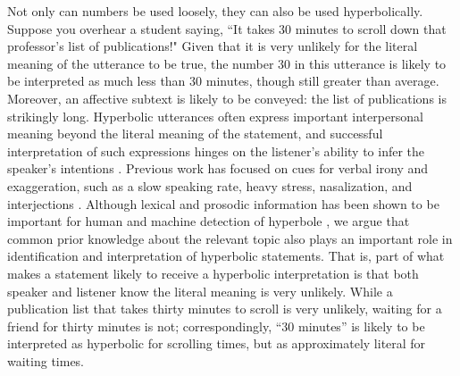 \documentclass{article} %
\begin{document}
Not only can numbers be used loosely, they can also be used hyperbolically.
Suppose you overhear a student saying, ``It takes 30 minutes to scroll down that professor's list of publications!" Given that it is very unlikely for the literal meaning of the utterance to be true, the number $30$ in this utterance is likely to be interpreted as much less than 30 minutes, though still greater than average. Moreover, an affective subtext is likely to be conveyed: the list of publications is strikingly long.
Hyperbolic utterances often express important interpersonal meaning beyond the literal meaning of the statement, and successful interpretation of such expressions hinges on the listener's ability to infer the speaker's intentions \cite{mccarthy2004there, gibbs2000irony, cano2003risk}. Previous work has focused on cues for verbal irony and exaggeration, such as a slow speaking rate, heavy stress, nasalization, and interjections \cite{kreuz1995two, kreuz2007lexical}. Although lexical and prosodic information has been shown to be important for human and machine detection of hyperbole \cite{davidov2010semi, reyes2011mining, van2007algorithm}, we argue that common prior knowledge about the relevant topic
also plays an important role in identification and interpretation of hyperbolic statements. That is, part of what makes a statement likely to receive a hyperbolic interpretation is that both speaker and listener know the literal meaning is very unlikely. 
While a publication list that takes thirty minutes to scroll is very unlikely, waiting for a friend for thirty minutes is not; correspondingly, ``30 minutes'' is likely to be interpreted as hyperbolic for scrolling times, but as approximately literal for waiting times.


\end{document}
